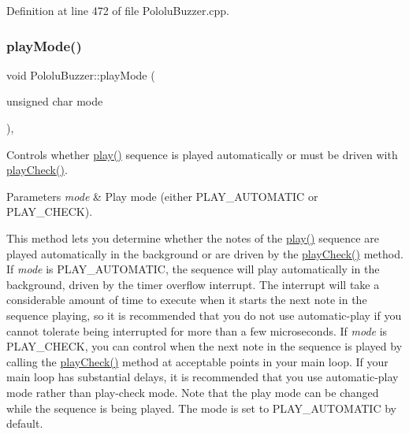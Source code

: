 Definition at line 472 of file Pololu\+Buzzer.\+cpp.

\mbox{\label{class_pololu_buzzer_ab72bde97ceceef8705f1bbaeccb970db}} 
\subsubsection{\texorpdfstring{play\+Mode()}{playMode()}}
{\footnotesize\ttfamily void Pololu\+Buzzer\+::play\+Mode (\begin{DoxyParamCaption}\item[{unsigned char}]{mode }\end{DoxyParamCaption})\hspace{0.3cm}{\ttfamily [static]}, {\ttfamily [inherited]}}



Controls whether {\ttfamily \hyperlink{class_pololu_buzzer_a22f45ef7cdf9dc8fc54e617244368277}{play()}} sequence is played automatically or must be driven with {\ttfamily \hyperlink{class_pololu_buzzer_a427225dcc85c1e65078e4397b9890929}{play\+Check()}}. 


\begin{DoxyParams}{Parameters}
{\em mode} & Play mode (either {\ttfamily P\+L\+A\+Y\+\_\+\+A\+U\+T\+O\+M\+A\+T\+IC} or {\ttfamily P\+L\+A\+Y\+\_\+\+C\+H\+E\+CK}).\\
\hline
\end{DoxyParams}
This method lets you determine whether the notes of the {\ttfamily \hyperlink{class_pololu_buzzer_a22f45ef7cdf9dc8fc54e617244368277}{play()}} sequence are played automatically in the background or are driven by the {\ttfamily \hyperlink{class_pololu_buzzer_a427225dcc85c1e65078e4397b9890929}{play\+Check()}} method. If {\itshape mode} is {\ttfamily P\+L\+A\+Y\+\_\+\+A\+U\+T\+O\+M\+A\+T\+IC}, the sequence will play automatically in the background, driven by the timer overflow interrupt. The interrupt will take a considerable amount of time to execute when it starts the next note in the sequence playing, so it is recommended that you do not use automatic-\/play if you cannot tolerate being interrupted for more than a few microseconds. If {\itshape mode} is {\ttfamily P\+L\+A\+Y\+\_\+\+C\+H\+E\+CK}, you can control when the next note in the sequence is played by calling the {\ttfamily \hyperlink{class_pololu_buzzer_a427225dcc85c1e65078e4397b9890929}{play\+Check()}} method at acceptable points in your main loop. If your main loop has substantial delays, it is recommended that you use automatic-\/play mode rather than play-\/check mode. Note that the play mode can be changed while the sequence is being played. The mode is set to {\ttfamily P\+L\+A\+Y\+\_\+\+A\+U\+T\+O\+M\+A\+T\+IC} by default. 


